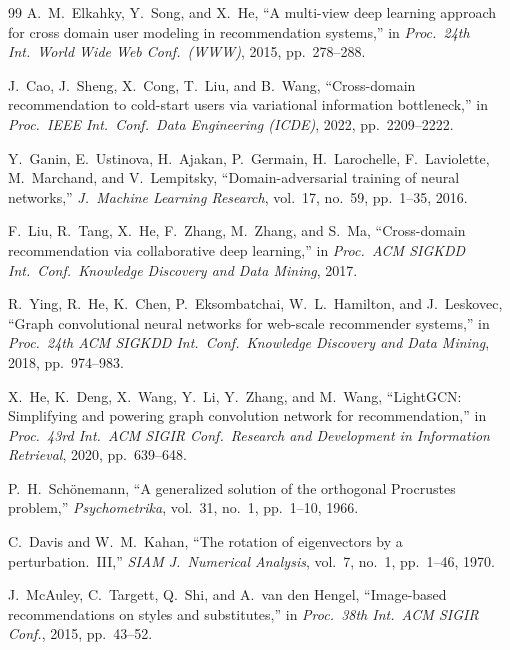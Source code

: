 \documentclass[conference]{IEEEtran}
\begin{document}
\begin{thebibliography}{99}
A.~M.~Elkahky, Y.~Song, and X.~He, ``A multi-view deep learning approach for cross domain user modeling in recommendation systems,'' in \emph{Proc.\ 24th Int.\ World Wide Web Conf.\ (WWW)}, 2015, pp.~278--288.

J.~Cao, J.~Sheng, X.~Cong, T.~Liu, and B.~Wang, ``Cross-domain recommendation to cold-start users via variational information bottleneck,'' in \emph{Proc.\ IEEE Int.\ Conf.\ Data Engineering (ICDE)}, 2022, pp.~2209--2222.

Y.~Ganin, E.~Ustinova, H.~Ajakan, P.~Germain, H.~Larochelle, F.~Laviolette, M.~Marchand, and V.~Lempitsky, ``Domain-adversarial training of neural networks,'' \emph{J.\ Machine Learning Research}, vol.~17, no.~59, pp.~1--35, 2016.

F.~Liu, R.~Tang, X.~He, F.~Zhang, M.~Zhang, and S.~Ma, ``Cross-domain recommendation via collaborative deep learning,'' in \emph{Proc.\ ACM SIGKDD Int.\ Conf.\ Knowledge Discovery and Data Mining}, 2017.

R.~Ying, R.~He, K.~Chen, P.~Eksombatchai, W.~L.~Hamilton, and J.~Leskovec, ``Graph convolutional neural networks for web-scale recommender systems,'' in \emph{Proc.\ 24th ACM SIGKDD Int.\ Conf.\ Knowledge Discovery and Data Mining}, 2018, pp.~974--983.

X.~He, K.~Deng, X.~Wang, Y.~Li, Y.~Zhang, and M.~Wang, ``LightGCN: Simplifying and powering graph convolution network for recommendation,'' in \emph{Proc.\ 43rd Int.\ ACM SIGIR Conf.\ Research and Development in Information Retrieval}, 2020, pp.~639--648.

P.~H.~Sch{\"o}nemann, ``A generalized solution of the orthogonal Procrustes problem,'' \emph{Psychometrika}, vol.~31, no.~1, pp.~1--10, 1966.

C.~Davis and W.~M.~Kahan, ``The rotation of eigenvectors by a perturbation.\ III,'' \emph{SIAM J.\ Numerical Analysis}, vol.~7, no.~1, pp.~1--46, 1970.

J.~McAuley, C.~Targett, Q.~Shi, and A.~van den Hengel, ``Image-based recommendations on styles and substitutes,'' in \emph{Proc.\ 38th Int.\ ACM SIGIR Conf.}, 2015, pp.~43--52.

\end{thebibliography}
\end{document}
